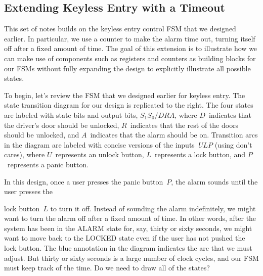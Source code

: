 \classtitle

\subsection{Extending Keyless Entry with a Timeout}

This set of notes builds on the keyless entry control FSM that we
designed earlier.  In particular, we use a counter to make the alarm
time out, turning itself off after a fixed amount of time.  The goal
of this extension is to illustrate how we can make use of components
such as registers and counters as building blocks for our FSMs
without fully expanding the design to explicitly illustrate all
possible states.


\begin{minipage}{2.05in}
To begin, let's review the FSM that we designed earlier for keyless 
entry.  The state transition diagram for our design is replicated to 
the right.
%
The four states are labeled with state bits and output bits,
$S_1S_0/DRA$, where $D$~indicates that the driver's door should
be unlocked, $R$~indicates that the rest of the doors should be
unlocked, and $A$~indicates that the alarm should be on.
%
Transition arcs in the diagram are labeled with concise versions of 
the inputs~$ULP$ (using don't cares), where $U$~represents an unlock
button, $L$~represents a lock button, and $P$~represents a panic 
button.\mpline

In this design, once a user presses the panic button~$P$, the alarm
sounds until the user presses the\linebreak\mpdone
\end{minipage}\hspace{0.25in}%
\begin{minipage}{4.2in}
\end{minipage}

lock button~$L$ to turn it off.
Instead of sounding the alarm indefinitely, we might want to turn
the alarm off after a fixed amount of time.  In other words, after 
the system has been in the ALARM state for, say, thirty or sixty seconds,
we might want to move back to the LOCKED state even if the user has
not pushed the lock button.  The blue annotation in the diagram indicates
the arc that we must adjust.  But thirty or sixty seconds is a large 
number of clock cycles, and our FSM must keep track of the time.
Do we need to draw all of the states?

